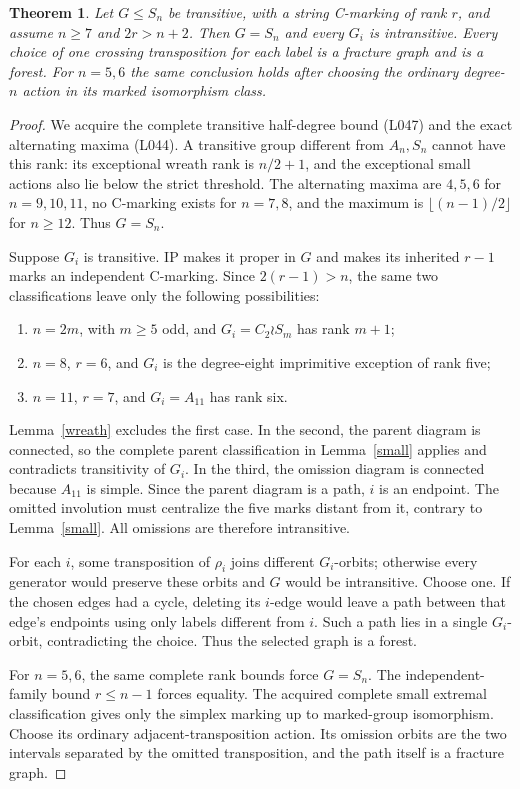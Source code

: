 \documentclass[11pt,a4paper]{article}
\newtheorem{theorem}[lemma]{Theorem}
\begin{document}
\begin{theorem}\label{main}
Let $G\le S_n$ be transitive, with a string C-marking of rank
$r$, and assume $n\ge7$ and $2r>n+2$. Then $G=S_n$ and every
$G_i$ is intransitive. Every choice of one crossing
transposition for each label is a fracture graph and is a
forest. For $n=5,6$ the same conclusion holds after choosing
the ordinary degree-$n$ action in its marked isomorphism class.
\end{theorem}
\begin{proof}
We acquire the complete transitive half-degree bound (L047)
and the exact alternating maxima (L044). A transitive group
different from $A_n,S_n$ cannot have this rank: its exceptional
wreath rank is $n/2+1$, and the exceptional small actions also
lie below the strict threshold. The alternating maxima are
$4,5,6$ for $n=9,10,11$, no C-marking exists for $n=7,8$,
and the maximum is $\lfloor(n-1)/2\rfloor$ for $n\ge12$.
Thus $G=S_n$.

Suppose $G_i$ is transitive. IP makes it proper in $G$ and
makes its inherited $r-1$ marks an independent C-marking.
Since $2(r-1)>n$, the same two classifications leave only
the following possibilities:
\begin{enumerate}
\item $n=2m$, with $m\ge5$ odd, and $G_i=C_2\wr S_m$
has rank $m+1$;
\item $n=8$, $r=6$, and $G_i$ is the degree-eight imprimitive
exception of rank five;
\item $n=11$, $r=7$, and $G_i=A_{11}$ has rank six.
\end{enumerate}
Lemma~\ref{wreath} excludes the first case. In the second,
the parent diagram is connected, so the complete parent
classification in Lemma~\ref{small} applies and contradicts
transitivity of $G_i$. In the third, the omission diagram is
connected because $A_{11}$ is simple. Since the parent diagram
is a path, $i$ is an endpoint. The omitted involution must
centralize the five marks distant from it, contrary to
Lemma~\ref{small}. All omissions are therefore intransitive.

For each $i$, some transposition of $\rho_i$ joins different
$G_i$-orbits; otherwise every generator would preserve these
orbits and $G$ would be intransitive. Choose one. If the chosen
edges had a cycle, deleting its $i$-edge would leave a path
between that edge's endpoints using only labels different
from $i$. Such a path lies in a single $G_i$-orbit, contradicting
the choice. Thus the selected graph is a forest.

For $n=5,6$, the same complete rank bounds force $G=S_n$.
The independent-family bound $r\le n-1$ forces equality.
The acquired complete small extremal classification gives
only the simplex marking up to marked-group isomorphism.
Choose its ordinary adjacent-transposition action. Its
omission orbits are the two intervals separated by the
omitted transposition, and the path itself is a fracture graph.
\end{proof}
\end{document}
